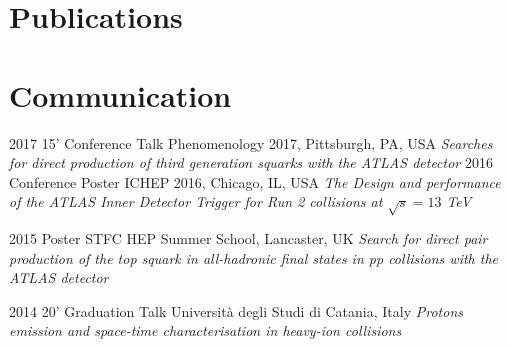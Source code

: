 \documentclass[print]{cv} %
\begin{document}
 \clearpage
 \section{Publications}
 \begin{refsection} %
 \nocite{*}
     \printbibliography[type=inproceedings, title={International peer-reviewed conferences/proceedings}, heading=bibheading]
\end{refsection}



\section{Communication}

\begin{entrylist}
  \entry
    {2017}
    {15' Conference Talk}
    {Phenomenology 2017, Pittsburgh, PA, USA}
    {\emph{Searches for direct production of third generation squarks with the ATLAS detector}}
  \entry
    {2016}
    {Conference Poster}
    {ICHEP 2016, Chicago, IL, USA}
    {\emph{The Design and performance of the ATLAS Inner Detector Trigger for Run 2 collisions at $\sqrt{s} = 13$ TeV}}

  \entry
    {2015}
    {Poster}
    {STFC HEP Summer School, Lancaster, UK}
    {\emph{Search for direct pair production of the top squark in all-hadronic final states in \emph{pp} collisions with the ATLAS detector}}

  \entry
    {2014}
    {20' Graduation Talk}
    {Università degli Studi di Catania, Italy}
    {\emph{Protons emission and space-time characterisation in heavy-ion collisions}}
\end{entrylist}
\end{document}
